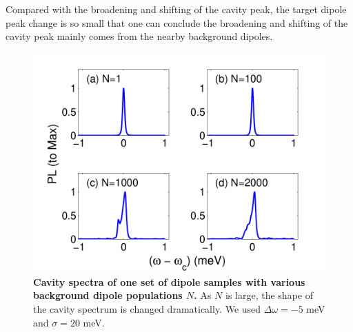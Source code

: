 Compared with the broadening and shifting of the cavity peak,
the target dipole peak change is so small that one can conclude the broadening and shifting of the cavity peak mainly comes from the nearby background dipoles.




\begin{figure}[htp]%
\centering
\begin{center}
\includegraphics[width=12cm]{./Figs/spec_wdrand5s20_E0dot2_qd2000_stat200_sam1} %
\end{center}
\caption[Spectra samples for $N$ background dipoles coupled cavity]{\textbf{  Cavity spectra of one set of dipole samples with various background dipole populations $N$.} As $N$ is large, the shape of the cavity spectrum is changed dramatically. We used $\Delta\omega=-5$ meV and $\sigma=20$ meV.}
\label{spec_wdrand5s20_E0.2_qd2000_stat200_sam32}
\end{figure}


